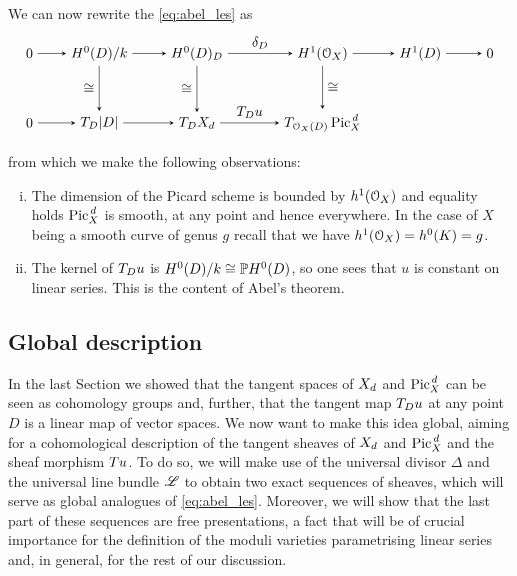 		We can now rewrite the \les \eqref{eq:abel_les} as
		\begin{equation}\label{eq:local_diagram}
		\begin{tikzpicture}[node distance=5em, auto]
			\node (O) 									{$0$};
			\node (A) 	[right of=O]		{$H^0(D)/k$};
			\node (B) 	[right of=A, xshift=2em]		{$H^0(D)_D$};
		  \node (C) 	[right of=B, xshift=4em] 		{$H^1(\OX)$};
		  \node (D) 	[right of=C, xshift=2em] 		{$H^1(D)$};
		  \node (OO) 	[right of=D] 		{$0$};
		  \node (O') 	[below of=O] 		{$0$};
			\node (A') 	[below of=A] 		{$ T_D |D|$};
		  \node (B') 	[below of=B] 		{$ T_D \Dd$};
		  \node (C') 	[below of=C] 		{$ T_{\OXD} \Pd $};
		  \node (D') 	[below of=D] 		{$\;$};
			\draw[-stealth] 				(O)		to node {} (A);
		  \draw[-stealth]					(A)		to node {} (B);
		  \draw[-stealth]					(B)		to node {$\delta_D$} (C);
		  \draw[-stealth]					(C)		to node {} (D);
			\draw[-stealth]					(D)		to node {} (OO);
			\draw[-stealth] 				(O')	to node {} (A');
		  \draw[-stealth]					(A')	to node {} (B');	  
		  \draw[-stealth]					(B')	to node {$T_D u$} (C');
		  \draw[-stealth][swap]		(A)		to node {$\cong$} (A');
		  \draw[-stealth][swap]		(B)		to node {$\cong$} (B');
		  \draw[-stealth]					(C)		to node {$\cong$} (C');
		\end{tikzpicture}
		\end{equation}	
		from which we make the following observations:
		\begin{enumerate}[i)]
			\item The dimension of the Picard scheme is bounded by $h^1(\mathcal{O}_X)$ and equality holds \ABiff $ \operatorname{Pic}^{\,d}_X$ is smooth, at any point and hence everywhere. In the case of $X$ being a smooth curve of genus $g$ recall that we have $h^1(\mathcal{O}_X)=h^0(K)=g$.
			\item The kernel of $T_D u$ is $H^0(D)/k \cong \mathbb{P} H^0(D)$, so one sees that $u$ is constant on linear series. This is the content of Abel's theorem.
		\end{enumerate}

	\subsection{Global description}

		In the last Section we showed that the tangent spaces of $X_d$ and $\operatorname{Pic}^{\,d}_X$ can be seen as cohomology groups and, further, that the tangent map $T_D u$ at any point $D$ is a linear map of vector spaces. 
		We now want to make this idea global, aiming for a cohomological description of the tangent sheaves of $X_d$ and $\operatorname{Pic}^{\,d}_X$ and the sheaf morphism $Tu$. 
		To do so, we will make use of the universal divisor $\Delta$ and the universal line bundle $\mathscr{L}$ to obtain two exact sequences of sheaves, which will serve as global analogues of \eqref{eq:abel_les}. 
		Moreover, we will show that the last part of these sequences are free presentations, a fact that will be of crucial importance for the definition of the moduli varieties parametrising linear series and, in general, for the rest of our discussion.\\

